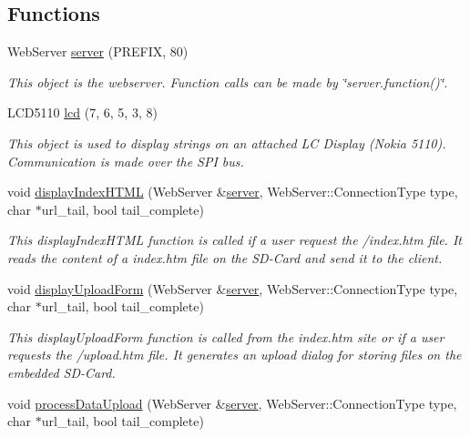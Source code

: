 \subsection*{Functions}
\begin{DoxyCompactItemize}
\item 
Web\-Server \hyperlink{_c_n_c_interface_8ino_a8373b6775f224fbef31c06c5ea115773}{server} (P\-R\-E\-F\-I\-X, 80)
\begin{DoxyCompactList}\small\item\em This object is the webserver. Function calls can be made by \char`\"{}server.\-function()\char`\"{}. \end{DoxyCompactList}\item 
L\-C\-D5110 \hyperlink{_c_n_c_interface_8ino_ae5c9f3714a16448bd453233d9c301afa}{lcd} (7, 6, 5, 3, 8)
\begin{DoxyCompactList}\small\item\em This object is used to display strings on an attached L\-C Display (Nokia 5110). Communication is made over the S\-P\-I bus. \end{DoxyCompactList}\item 
void \hyperlink{_c_n_c_interface_8ino_a33f47f7a56fbb4f0d86bd5036002eae5}{display\-Index\-H\-T\-M\-L} (Web\-Server \&\hyperlink{_c_n_c_interface_8ino_a8373b6775f224fbef31c06c5ea115773}{server}, Web\-Server\-::\-Connection\-Type type, char $\ast$url\-\_\-tail, bool tail\-\_\-complete)
\begin{DoxyCompactList}\small\item\em This display\-Index\-H\-T\-M\-L function is called if a user request the /index.htm file. It reads the content of a index.\-htm file on the S\-D-\/\-Card and send it to the client. \end{DoxyCompactList}\item 
void \hyperlink{_c_n_c_interface_8ino_a47b833a05e1492337a34ac1d3e8ecd86}{display\-Upload\-Form} (Web\-Server \&\hyperlink{_c_n_c_interface_8ino_a8373b6775f224fbef31c06c5ea115773}{server}, Web\-Server\-::\-Connection\-Type type, char $\ast$url\-\_\-tail, bool tail\-\_\-complete)
\begin{DoxyCompactList}\small\item\em This display\-Upload\-Form function is called from the index.\-htm site or if a user requests the /upload.htm file. It generates an upload dialog for storing files on the embedded S\-D-\/\-Card. \end{DoxyCompactList}\item 
void \hyperlink{_c_n_c_interface_8ino_a6ab3866008f887c900e59b452631a48d}{process\-Data\-Upload} (Web\-Server \&\hyperlink{_c_n_c_interface_8ino_a8373b6775f224fbef31c06c5ea115773}{server}, Web\-Server\-::\-Connection\-Type type, char $\ast$url\-\_\-tail, bool tail\-\_\-complete)

\end{DoxyCompactItemize}
